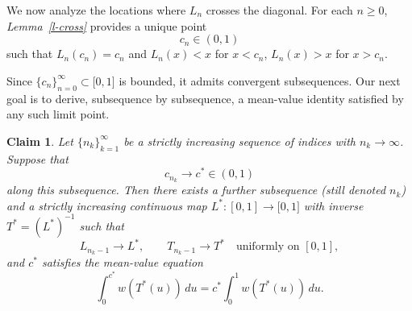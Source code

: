 \documentclass[onecolumn]{article}
\newtheorem{claim}[theorem]{Claim}
\begin{document}
We now analyze the locations where $L_{n}$ crosses the diagonal. For each $%
n\geq 0$, \textit{Lemma~\ref{l-cross}} provides a unique point 
\begin{equation}
c_{n}\in (0,1)  \label{508a}
\end{equation}%
such that $L_{n}(c_{n})=c_{n}$ and $L_{n}(x)<x$ for $x<c_{n}$, $L_{n}(x)>x$
for $x>c_{n}$.

Since $\{c_{n}\}_{n=0}^{\infty }\subset \lbrack 0,1]$ is bounded, it admits
convergent subsequences. Our next goal is to derive, subsequence by
subsequence, a mean-value identity satisfied by any such limit point.

\begin{claim}
\label{subseq-MV} Let $\{n_{k}\}_{k=1}^{\infty }$ be a strictly increasing
sequence of indices with $n_{k}\rightarrow \infty $. Suppose that 
\begin{equation}
c_{n_{k}}\longrightarrow c^{\ast }\in (0,1)  \label{508b}
\end{equation}%
along this subsequence. Then there exists a further subsequence (still
denoted $n_{k}$) and a strictly increasing continuous map $L^{\ast
}:[0,1]\rightarrow \lbrack 0,1]$ with inverse $T^{\ast }=(L^{\ast })^{-1}$
such that 
\begin{equation*}
L_{n_{k}-1}\rightarrow L^{\ast },\qquad T_{n_{k}-1}\rightarrow T^{\ast
}\quad \text{uniformly on }[0,1],
\end{equation*}%
and $c^{\ast }$ satisfies the mean-value equation 
\begin{equation}
\int_{0}^{c^{\ast }}w(T^{\ast }(u))\,du=c^{\ast }\int_{0}^{1}w(T^{\ast
}(u))\,du.  \label{509}
\end{equation}
\end{claim}
\end{document}
